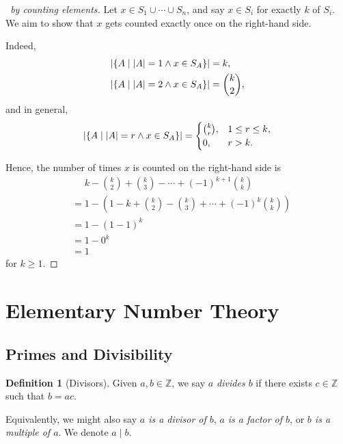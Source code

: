 \documentclass{article}
\theoremstyle{definition}
\newtheorem{definition}[theorem]{Definition}
\theoremstyle{remark}
\DeclarePairedDelimiter{\abs}{\lvert}{\rvert}
\newcommand{\pqty}[1]{\left(#1\right)}
\newcommand{\set}[2]{\{#1\mid #2\}}
\newcommand{\divides}{\mid}
\newcommand{\ZZ}{\mathbb{Z}}
\begin{document}
\begin{proof}[\proofname\ by counting elements]
    Let \(x \in S_1 \cup \cdots \cup S_n\), and say \(x \in S_i\) for exactly \(k\) of \(S_i\). We aim to show that \(x\) gets counted exactly once on the right-hand side.

    Indeed,
    \begin{align*}
        \abs{\set{A}{\abs{A} = 1 \land x \in S_A}} &= k, \\
        \abs{\set{A}{\abs{A} = 2 \land x \in S_A}} &= \binom{k}{2},
    \end{align*}
    and in general,
    \[
        \abs{\set{A}{\abs{A} = r \land x \in S_A}} = \begin{cases}
            \binom{k}{r}, & 1 \leq r \leq k, \\ 0, & r > k.
        \end{cases}
    \]

    Hence, the number of times \(x\) is counted on the right-hand side is
    \begin{align*}
        & \phantom{=} k - \binom{k}{2} + \binom{k}{3} - \cdots + \pqty{-1}^{k + 1} \binom{k}{k} \\
        &= 1 - \pqty{1 - k + \binom{k}{2} - \binom{k}{3} + \cdots + \pqty{-1}^{k} \binom{k}{k}} \\
        &= 1 - \pqty{1 - 1}^k \\
        &= 1 - 0^k \\
        &= 1
    \end{align*}
    for \(k \geq 1\).
\end{proof}

\section{Elementary Number Theory}
\label{sec:elementary-number-theory}

\subsection{Primes and Divisibility}
\label{sec:primes-and-divisibility}

\begin{definition}[Divisors]
    Given \(a, b \in \ZZ\), we say \emph{\(a\) divides \(b\)} if there exists \(c \in \ZZ\) such that \(b = ac\).

    Equivalently, we might also say \emph{\(a\) is a divisor of \(b\)}, \emph{\(a\) is a factor of \(b\)}, or \emph{\(b\) is a multiple of \(a\)}. We denote \(a \divides b\).
\end{definition}
\end{document}
